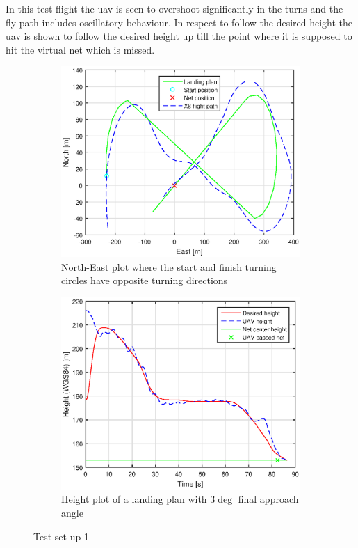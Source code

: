 In this test flight the \gls{uav} is seen to overshoot significantly in the turns and the fly path includes oscillatory behaviour. In respect to follow the desired height the \gls{uav} is shown to follow the desired height up till the point where it is supposed to hit the virtual net which is missed.
\newpage
\begin{figure}[H]
\centering
\begin{subfigure}{0.7\textwidth}
		\includegraphics[width=\textwidth]{figs/Experiment/NorthEast31mai103029.eps}
		\caption{North-East plot where the start and finish turning circles have opposite turning directions}
		\label{Fig:NorthEast31mai103029}
\end{subfigure}
\begin{subfigure}{0.7\textwidth}
		\includegraphics[width=\textwidth]{figs/Experiment/Height31mai103029.eps}
		\caption{Height plot of a landing plan with $3 \deg$ final approach angle}
		\label{Fig:Height31mai103029}
\end{subfigure}
\caption{Test set-up 1}
\label{Fig:Test1}
\end{figure}
